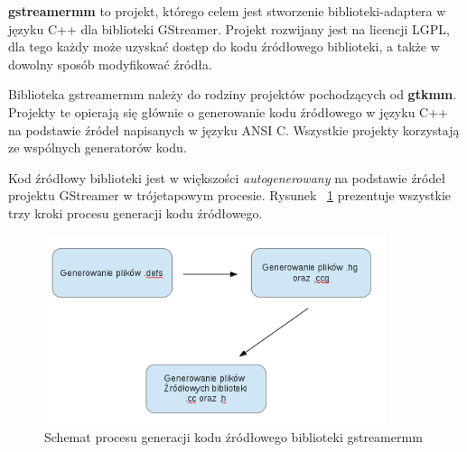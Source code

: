 \documentclass[12pt]{article}
\begin{document}
\textbf{gstreamermm} to projekt, którego celem jest stworzenie biblioteki-adaptera w języku C++ dla biblioteki GStreamer. Projekt rozwijany jest na licencji LGPL, dla tego każdy może uzyskać dostęp do kodu źródłowego biblioteki, a także w dowolny sposób modyfikować źródła.

Biblioteka gstreamermm należy do rodziny projektów pochodzących od \textbf{gtkmm}. Projekty te opierają się głównie o generowanie kodu źródłowego w języku C++ na podstawie źródeł napisanych w języku ANSI C. Wszystkie projekty korzystają ze wspólnych generatorów kodu.

Kod źródłowy biblioteki jest w większości \textit{autogenerowany} na podstawie źródeł projektu GStreamer w trójetapowym procesie. Rysunek ~\ref{fig:mmGenerateProcess} prezentuje wszystkie trzy kroki procesu generacji kodu źródłowego.
\begin{figure}[H]
  \includegraphics[width=100mm]{img/mm-generate-process.png}
  \caption{Schemat procesu generacji kodu źródłowego biblioteki gstreamermm}
  \label{fig:mmGenerateProcess}
\end{figure}
\end{document}
